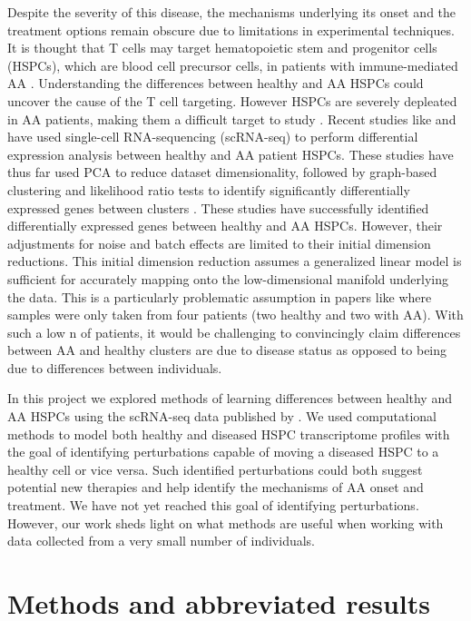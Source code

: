 \documentclass{article}
\begin{document}
Despite the severity of this disease, the mechanisms underlying its onset and the treatment options remain obscure due to limitations in experimental techniques.
It is thought that T cells may target hematopoietic stem and progenitor cells (HSPCs), which are blood cell precursor cells, in patients with immune-mediated AA \citep{tonglin_single-cell_2022}.
Understanding the differences between healthy and AA HSPCs could uncover the cause of the T cell targeting.
However HSPCs are severely depleated in AA patients, making them a difficult target to study \citep{zhu_single-cell_2021}.
Recent studies like \citet{tonglin_single-cell_2022} and \citet{zhu_single-cell_2021} have used single-cell RNA-sequencing (scRNA-seq) to perform differential expression analysis between healthy and AA patient HSPCs.
These studies have thus far used PCA to reduce dataset dimensionality, followed by graph-based clustering and likelihood ratio tests to identify significantly differentially expressed genes between clusters \citep{zhu_single-cell_2021}.
These studies have successfully identified differentially expressed genes between healthy and AA HSPCs.
However, their adjustments for noise and batch effects are limited to their initial dimension reductions.
This initial dimension reduction assumes a generalized linear model is sufficient for accurately mapping onto the low-dimensional manifold underlying the data.
This is a particularly problematic assumption in papers like \citet{tonglin_single-cell_2022} where samples were only taken from four patients (two healthy and two with AA).
With such a low n of patients, it would be challenging to convincingly claim differences between AA and healthy clusters are due to disease status as opposed to being due to differences between individuals.

In this project we explored methods of learning differences between healthy and AA HSPCs using the scRNA-seq data published by \citet{tonglin_single-cell_2022}.
We used computational methods to model both healthy and diseased HSPC transcriptome profiles with the goal of identifying perturbations capable of moving a diseased HSPC to a healthy cell or vice versa.
Such identified perturbations could both suggest potential new therapies and help identify the mechanisms of AA onset and treatment.
We have not yet reached this goal of identifying perturbations.
However, our work sheds light on what methods are useful when working with data collected from a very small number of individuals.


\section{Methods and abbreviated results}
\end{document}
